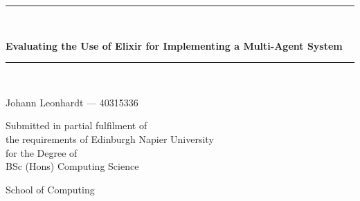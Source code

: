 \newcommand{\HRule}{\rule{\linewidth}{0.5mm}}

\begin{titlepage}
\begin{center}
\HRule{} \\[0.4cm]
    {\large \bfseries Evaluating the Use of Elixir for Implementing a Multi-Agent System\par}
\vspace{0.2cm}
\HRule{} \\[1.5cm]

\vspace{3cm}
\begin{minipage}{0.5\textwidth}
    \begin{center} \large
        Johann Leonhardt --- 40315336      
    \end{center}
\end{minipage}

\vspace{2cm}
\begin{minipage}{1\textwidth}
    \begin{center} \large
    Submitted in partial fulfilment of \\
    the requirements of Edinburgh Napier University \\
    for the Degree of \\
    BSc (Hons) Computing Science
    \end{center}
\end{minipage}

\vfill

\begin{minipage}{1\textwidth}
    \begin{center} \large
    School of Computing
    \end{center}
\end{minipage}

\vspace{1cm}{\large \today}
\end{center}
\end{titlepage}

